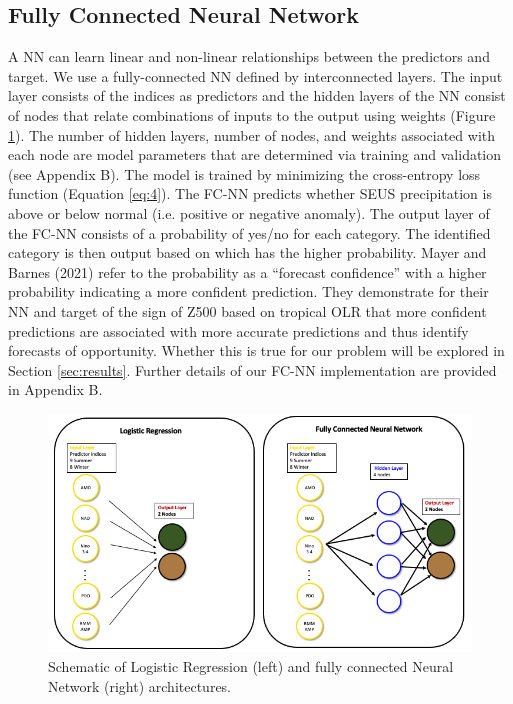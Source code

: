 \documentclass{ametsocV6.1}
\begin{document}
\subsection{Fully Connected Neural Network}
\label{sec:fcnn}
A NN can learn linear and non-linear relationships between the predictors and target. We use a fully-connected NN defined by interconnected layers. The input layer consists of the indices as predictors and the hidden layers of the NN consist of nodes that relate combinations of inputs to the output using weights (Figure \ref{f2}). The number of hidden layers, number of nodes, and weights associated with each node are model parameters that are determined via training and validation (see Appendix B). The model is trained by minimizing the cross-entropy loss function (Equation \ref{eq:4}). The FC-NN predicts whether SEUS precipitation is above or below normal (i.e. positive or negative anomaly). The output layer of the FC-NN consists of a probability of yes/no for each category. The identified category is then output based on which has the higher probability. Mayer and Barnes (2021) refer to the probability as a “forecast confidence” with a higher probability indicating a more confident prediction. They demonstrate for their NN and target of the sign of Z500 based on tropical OLR that more confident predictions are associated with more accurate predictions and thus identify forecasts of opportunity. Whether this is true for our problem will be explored in Section \ref{sec:results}. Further details of our FC-NN implementation are provided in Appendix B.

\begin{figure}[t]
  \noindent\includegraphics[width=35pc,angle=0]{Figure2.png}
  \caption{Schematic of Logistic Regression (left) and fully connected Neural Network (right) architectures.}\label{f2}
\end{figure}
\end{document}

